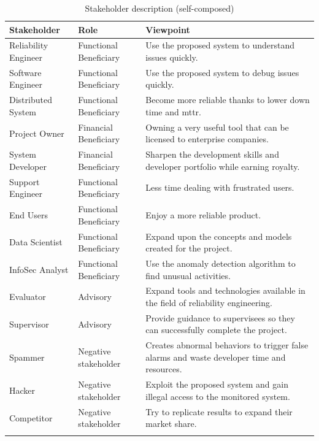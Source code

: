 \begin{longtable}{|p{35mm}|p{44mm}|p{72mm}|}
    \hline
    \textbf{Stakeholder} &
    \textbf{Role} &
    \textbf{Viewpoint} 
    \\ \hline
    
    Reliability Engineer &
    Functional Beneficiary &
    Use the proposed system to understand issues quickly. \\ \hline
    
    Software Engineer &
    Functional Beneficiary &
    Use the proposed system to debug issues quickly. \\ \hline
    
    Distributed System &
    Functional Beneficiary &
    Become more reliable thanks to lower down time and \ac{mttr}. \\ \hline
    
    Project Owner &
    Financial Beneficiary &
    Owning a very useful tool that can be licensed to enterprise companies. \\ \hline
    
    System Developer &
    Financial Beneficiary &
    Sharpen the development skills and developer portfolio while earning royalty. \\ \hline
    
    Support Engineer &
    Functional Beneficiary &
    Less time dealing with frustrated users. \\ \hline
    
    End Users &
    Functional Beneficiary &
    Enjoy a more reliable product. \\ \hline
    
    Data Scientist &
    Functional Beneficiary &
    Expand upon the concepts and models created for the project. \\ \hline
    
    InfoSec Analyst &
    Functional Beneficiary &
    Use the anomaly detection algorithm to find unusual activities. \\ \hline
    
    Evaluator & 
    Advisory &
    Expand tools and technologies available in the field of reliability engineering. \\ \hline
    
    Supervisor &
    Advisory &
    Provide guidance to supervisees so they can successfully complete the project. \\ \hline
    
    Spammer &
    Negative stakeholder & Creates abnormal behaviors to trigger false alarms and waste developer time and resources. \\ \hline
    
    Hacker &
    Negative stakeholder &
    Exploit the proposed system and gain illegal access to the monitored system. \\ \hline
    
    Competitor &
    Negative stakeholder &
    Try to replicate results to expand their market share. \\ \hline
\caption{Stakeholder description (self-composed)}
\end{longtable}